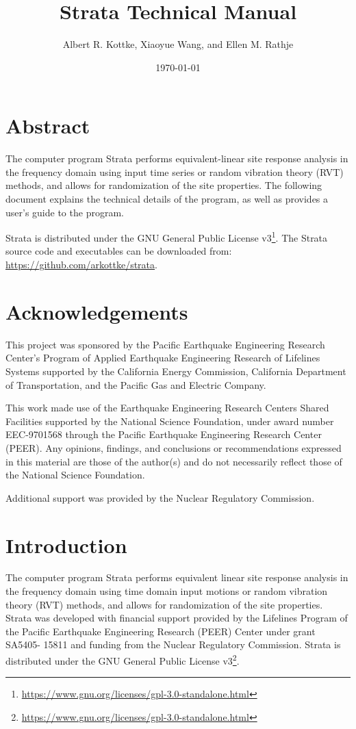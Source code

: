 \documentclass[12pt,oneside]{book}
\title{Strata Technical Manual}
\author{Albert R. Kottke, Xiaoyue Wang, and Ellen M. Rathje}
\date{\today}
\begin{document}
\frontmatter
\maketitle

\chapter{Abstract}
The computer program Strata performs equivalent-linear site response analysis in
the frequency domain using input time series or random vibration theory (RVT)
methods, and allows for randomization of the site properties. The following
document explains the technical details of the program, as well as provides a
user's guide to the program.

Strata is distributed under the GNU General Public License
v3\footnote{\url{https://www.gnu.org/licenses/gpl-3.0-standalone.html}}. The
Strata source code and executables can be downloaded from:
\url{https://github.com/arkottke/strata}.

\chapter{Acknowledgements}
This project was sponsored by the Pacific Earthquake Engineering Research
Center's Program of Applied Earthquake Engineering Research of Lifelines Systems
supported by the California Energy Commission, California Department of
Transportation, and the Pacific Gas and Electric Company.

This work made use of the Earthquake Engineering Research Centers Shared
Facilities supported by the National Science Foundation, under award number
EEC-9701568 through the Pacific Earthquake Engineering Research Center (PEER).
Any opinions, findings, and conclusions or recommendations expressed in this
material are those of the author(s) and do not necessarily reflect those of the
National Science Foundation.

Additional support was provided by the Nuclear Regulatory Commission.

\tableofcontents
\listoffigures
\listoftables

\mainmatter

\chapter{Introduction}

The computer program Strata performs equivalent linear site response analysis in
the frequency domain using time domain input motions or random vibration theory
(RVT) methods, and allows for randomization of the site properties. Strata was
developed with financial support provided by the Lifelines Program of the
Pacific Earthquake Engineering Research (PEER) Center under grant SA5405- 15811
and funding from the Nuclear Regulatory Commission. Strata is distributed under
the GNU General Public License
v3\footnote{\url{https://www.gnu.org/licenses/gpl-3.0-standalone.html}}.
\end{document}
